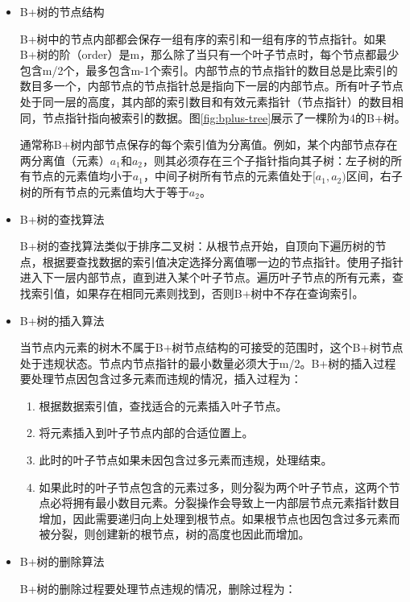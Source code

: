 \begin{itemize}

\item B+树的节点结构

B+树中的节点内部都会保存一组有序的索引和一组有序的节点指针。如果B+树的阶（order）是m，那么除了当只有一个叶子节点时，每个节点都最少包含m/2个，最多包含m-1个索引。内部节点的节点指针的数目总是比索引的数目多一个，内部节点的节点指针总是指向下一层的内部节点。所有叶子节点处于同一层的高度，其内部的索引数目和有效元素指针（节点指针）的数目相同，节点指针指向被索引的数据。图\ref{fig:bplus-tree}展示了一棵阶为4的B+树。

通常称B+树内部节点保存的每个索引值为分离值。例如，某个内部节点存在两分离值（元素）$a_1$和$a_2$，则其必须存在三个子指针指向其子树：左子树的所有节点的元素值均小于$a_1$，中间子树所有节点的元素值处于$[a_1,a_2)$区间，右子树的所有节点的元素值均大于等于$a_2$。

\item B+树的查找算法

B+树的查找算法类似于排序二叉树：从根节点开始，自顶向下遍历树的节点，根据要查找数据的索引值决定选择分离值哪一边的节点指针。使用子指针进入下一层内部节点，直到进入某个叶子节点。遍历叶子节点的所有元素，查找索引值，如果存在相同元素则找到，否则B+树中不存在查询索引。

\item B+树的插入算法

当节点内元素的树木不属于B+树节点结构的可接受的范围时，这个B+树节点处于违规状态。节点内节点指针的最小数量必须大于m/2。B+树的插入过程要处理节点因包含过多元素而违规的情况，插入过程为：
\begin{enumerate}
\item 根据数据索引值，查找适合的元素插入叶子节点。
\item 将元素插入到叶子节点内部的合适位置上。
\item 此时的叶子节点如果未因包含过多元素而违规，处理结束。
\item 如果此时的叶子节点包含的元素过多，则分裂为两个叶子节点，这两个节点必将拥有最小数目元素。分裂操作会导致上一内部层节点元素指针数目增加，因此需要递归向上处理到根节点。如果根节点也因包含过多元素而被分裂，则创建新的根节点，树的高度也因此而增加。
\end{enumerate}

\item B+树的删除算法

B+树的删除过程要处理节点违规的情况，删除过程为：


\end{itemize}
